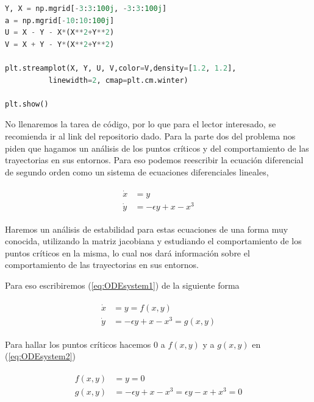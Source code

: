 \documentclass[a4paper,10pt]{article}
\numberwithin{equation}{section}
\begin{document}
\begin{lstlisting}[language=Python]
Y, X = np.mgrid[-3:3:100j, -3:3:100j]
a = np.mgrid[-10:10:100j]
U = X - Y - X*(X**2+Y**2)
V = X + Y - Y*(X**2+Y**2)

plt.streamplot(X, Y, U, V,color=V,density=[1.2, 1.2], 
	      linewidth=2, cmap=plt.cm.winter)

plt.show()
\end{lstlisting}

No llenaremos la tarea de código, por lo que para el lector interesado, se recomienda
ir al link del repositorio dado. Para la parte dos del problema nos piden que hagamos un análisis de los puntos críticos
y del comportamiento de las trayectorias en sus entornos. Para eso podemos reescribir
la ecuación diferencial de segundo orden como un sistema de ecuaciones diferenciales
lineales,


\begin{align}
 \begin{split}
  \dot{x} &= y \\
  \dot{y} &= - \epsilon y + x - x^3
 \end{split}
 \label{eq:ODEsystem1}
\end{align}

Haremos un análisis de estabilidad para estas ecuaciones de una forma muy conocida, utilizando
la matriz jacobiana y estudiando el comportamiento de los puntos críticos en la misma,
lo cual nos dará información sobre el comportamiento de las trayectorias en sus entornos.

\vspace{.3cm}

Para eso escribiremos (\ref{eq:ODEsystem1}) de la siguiente forma

\begin{align}
 \begin{split}
  \dot{x} &= y = f(x,y)\\
  \dot{y} &= - \epsilon y + x - x^3 = g(x,y)
 \end{split}
 \label{eq:ODEsystem2}
\end{align}

Para hallar los puntos críticos hacemos $0$ a $f(x,y)$ y a $g(x,y)$ en (\ref{eq:ODEsystem2})

\begin{align}
 \begin{split}
  f(x,y) &= y = 0\\
  g(x,y) &= -\epsilon y + x - x^3 = \epsilon y -x + x^3  = 0
 \label{eq:ODEsystem3}
 \end{split}
\end{align}
\end{document}
